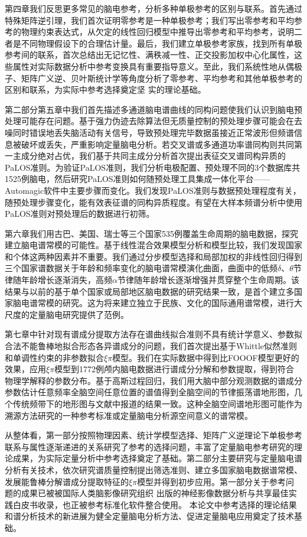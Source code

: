 第四章我们反思更多常见的脑电参考，分析多种单极参考的区别与联系。首先通过特殊矩阵逆引理，我们首次证明零参考是一种单极参考；我们写出零参考和平均参考的物理约束表达式，从欠定的线性回归模型中推导出零参考和平均参考，说明二者是不同物理假设下的合理估计量。最后，我们建立单极参考家族，找到所有单极参考间的联系，首次总结出无记忆性、满秩减一性、正交投影加权中心化属性，这些属性对实际数据分析中参考变换具有重要指导意义。至此，我们系统性地从偶极子、矩阵广义逆、贝叶斯统计学等角度分析了零参考、平均参考和其他单极参考的区别和联系，为实际中参考选择奠定坚
实的理论基础。

第二部分第五章中我们首先描述多通道脑电谱曲线的同构问题使我们认识到脑电预处理可能存在问题。基于强力伪迹去除算法但无质量控制的预处理步骤可能会在去噪同时错误地丢失脑活动有关信号，导致预处理完毕数据虽接近正常波形但频谱信息被破坏或丢失，严重影响定量脑电分析。若交叉谱或多通道功率谱同构则共同第一主成分绝对占优，我们基于共同主成分分析首次提出表征交叉谱同构异质的PaLOS准则。为验证PaLOS准则，我们分析电极配置、预处理不同的3个数据库共1525例脑电，然后研究PaLOS准则如何随预处理工具集成一体化平台——Automagic软件中主要步骤而变化。我们发现PaLOS准则与数据预处理程度有关，随预处理步骤变化，能有效表征谱的同构异质程度。有望在大样本频谱分析中使用PaLOS准则对预处理后的数据进行初筛。

第六章我们用古巴、美国、瑞士等三个国家535例覆盖生命周期的脑电数据，探究建立脑电谱常模的可能性。基于线性混合效果模型分析和模型比较，我们发现国家和个体这两种因素并不重要。我们通过分步模型选择和局部加权的非线性回归得到三个国家谱数据关于年龄和频率变化的脑电谱常模演化曲面，曲面中的低频$\delta$、$\theta$节律随年龄增长逐渐消失，高频$\alpha$节律随年龄增长逐渐增强并贯穿整个生命周期。该结果与以前的基于单个国家或局部地区脑电数据的研究结果一致，是首个建立多国家脑电谱常模的研究。这为将来建立独立于民族、文化的国际通用谱常模，进行大尺度的定量脑电研究提供了范例。

第七章中针对现有谱成分提取方法存在谱曲线拟合准则不具有统计学意义、参数拟合法不能鲁棒地拟合形态各异谱成分的问题，我们首次提出基于Whittle似然准则和单调性约束的非参数拟合$\xi\pi$模型。我们在实际数据中得到比FOOOF模型更好的效果，应用$\xi\pi$模型到1772例颅内脑电数据进行谱成分分解和参数提取，得到符合物理学解释的参数分布。基于高斯过程回归，我们用大脑中部分观测数据的谱成分参数估计任意频率全脑空间任意位置的谱值得到全脑空间的节律振荡谱地形图，几个传统频带下的地形图与文献中报道的结果一致。这种全脑空间谱地形图可能作为溯源方法研究的一种参考标准或定量脑电分析源空间意义的谱常模。

从整体看，第一部分按照物理因素、统计学模型选择、矩阵广义逆理论下单极参考联系与属性逐渐递进的关系研究了参考的选择问题，丰富了定量脑电参考研究的理论成果，为实际定量分析中参考选择奠定了基础。第二部分主要研究与定量脑电谱分析有关技术，依次研究谱质量控制提出筛选准则、建立多国家脑电数据谱常模、发展能鲁棒分解谱成分提取特征的$\xi\pi$模型并得到初步应用。第一部分关于参考问题的成果已被被国际人类脑影像研究组织
出版的神经影像数据分析与共享最佳实践白皮书收录，也正被参考标准化软件整合使用。
本论文中参考选择的理论结果和谱分析技术的新进展为健全定量脑电分析方法、促进定量脑电应用奠定了技术基础。

